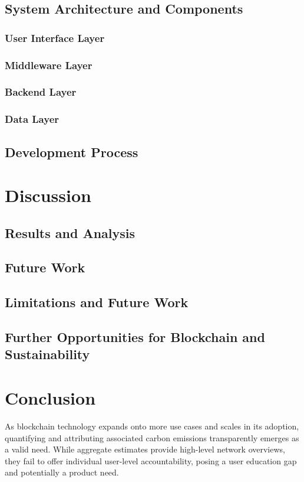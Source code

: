 \documentclass[11pt]{report}
\begin{document}
\section{System Architecture and Components}
\subsection{User Interface Layer}
\subsection{Middleware Layer}
\subsection{Backend Layer}
\subsection{Data Layer}
\section{Development Process}

\chapter{Discussion}
\section{Results and Analysis}
\section{Future Work}



\newpage


\section{Limitations and Future Work} \label{se:limitations}
\section{Further Opportunities for Blockchain and Sustainability}

\chapter{Conclusion}

As blockchain technology expands onto more use cases and scales in its adoption, quantifying and attributing associated carbon emissions transparently emerges as a valid need. While aggregate estimates provide high-level network overviews, they fail to offer individual user-level accountability, posing a user education gap and potentially a product need.
\end{document}

